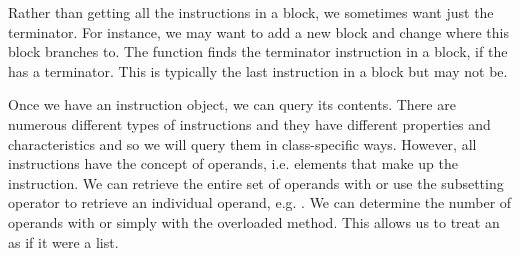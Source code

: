 \documentclass[article]{jss}
\begin{document}
\begin{comment}
Each element returned appears in \R{} as a generic
\Rclass{Instruction} object. 
This means that we can 
We can determine the nature of an
instruction by examing its ``op code'' with the function
\Rfunc{getOpcode}.  This returns a named integer value. The name tells
is the human-readable type while the integer is the enumeration
constant used in \Cpp.
For example, in our \Cfunc{v_dnorm} routine,
we can retrieve the op codes for the instructions
in the block  that implements the body of the \Ckeyword{for} loop with
\begin{RCode}
block = getBlocks(vfun$fun)[['for.body']]
sapply(block[], getOpcode)
\end{RCode}
The result is
\begin{ROutput}
         load          sext          load getelementptr 
           27            35            27            29 
         load          load          load          call 
           27            27            27            48 
         load          sext          load getelementptr 
           27            35            27            29 
        store          load           add         store 
           28            27             8            28 
           br 
            2 
\end{ROutput} 
We can coerce the generic \Rclass{Instruction} object to a more 
specific class using \Rfunc{as}.
For example, the fourth instruction has an op code 
named \texttt{getelementptr}. This corresponds to the
\Rclass{GetElementPtrInst} class in \R.
\begin{RCode}
as(b[[4]], 'GetElementPtrInst')
\end{RCode}
\end{comment}


Rather than getting all the instructions in a block, we sometimes want
just the terminator.  For instance, we may want to add a new block and
change where this block branches to.  The function
 finds the terminator instruction in a block, if
the  has a terminator.  This is typically the last
instruction in a block but may not be.


Once we have an instruction object, we can query its contents. There
are numerous different types of instructions and they have different
properties and characteristics and so we will query them in
class-specific ways.  However, all instructions have the concept of
operands, i.e. elements that make up the instruction.  We can retrieve
the entire set of operands with  or use the
subsetting operator to retrieve an individual operand, e.g.
.  We can determine the number of operands with
 or simply with the overloaded 
method.  This allows us to treat an  as if it were
a list.
\end{document}
